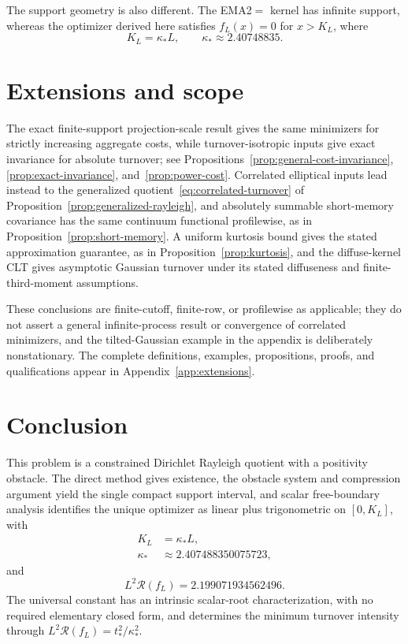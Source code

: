\documentclass[11pt]{article}
\theoremstyle{definition}
\theoremstyle{remark}
\newcommand{\Rcal}{\mathcal R}
\begin{document}
The support geometry is also different. The EMA2$=$ kernel has infinite support,
whereas the optimizer derived here satisfies $f_L(x)=0$ for $x>K_L$, where
\[
 K_L=\kappa_*L,\qquad \kappa_*\approx2.40748835.
\]

\section{Extensions and scope}\label{sec:extensions}
The exact finite-support projection-scale result gives the same minimizers for
strictly increasing aggregate costs, while turnover-isotropic inputs give exact
invariance for absolute turnover; see Propositions~\ref{prop:general-cost-invariance},
\ref{prop:exact-invariance}, and~\ref{prop:power-cost}. Correlated elliptical inputs lead instead to
the generalized quotient~\eqref{eq:correlated-turnover} of
Proposition~\ref{prop:generalized-rayleigh}, and absolutely summable
short-memory covariance has the same continuum functional profilewise, as in
Proposition~\ref{prop:short-memory}. A uniform kurtosis bound gives the stated
approximation guarantee, as in Proposition~\ref{prop:kurtosis}, and the diffuse-kernel CLT gives asymptotic Gaussian
turnover under its stated diffuseness and finite-third-moment assumptions.

These conclusions are finite-cutoff, finite-row, or profilewise as applicable;
they do not assert a general infinite-process result or convergence of
correlated minimizers, and the tilted-Gaussian example in the appendix is
deliberately nonstationary. The complete
definitions, examples, propositions, proofs, and qualifications appear in
Appendix~\ref{app:extensions}.

\section{Conclusion}
This problem is a constrained Dirichlet Rayleigh quotient with a positivity
obstacle. The direct method gives existence, the obstacle system and compression
argument yield the single compact support interval, and scalar free-boundary
analysis identifies the unique optimizer as linear plus trigonometric on
$[0,K_L]$, with
\[
 \begin{aligned}
 K_L&=\kappa_*L,\\
 \kappa_*&\approx2.407488350075723,
 \end{aligned}
\]
and
\[
 L^2\Rcal(f_L)=2.199071934562496.
\]
The universal constant has an intrinsic scalar-root characterization, with no
required elementary closed form, and determines the minimum turnover intensity
through $L^2\Rcal(f_L)=t_*^2/\kappa_*^2$.
\end{document}
